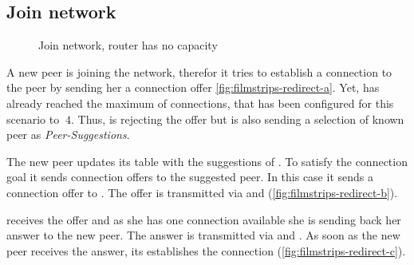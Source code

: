 \subsection{Join network }

\begin{figure}[htb!]
  \centering
	\caption{Join network, router has no capacity}
\label{fig:filmstrips-redirect}
\end{figure}

A new peer is joining the network, therefor it tries to establish a connection to the \router peer \alice by sending her a connection offer \vref{fig:filmstrips-redirect-a}. 
Yet, \alice has already reached the maximum of connections, that has been configured for this scenario to $\ 4 $. Thus, \alice is rejecting the offer but is also sending a selection of known peer as \textit{Peer-Suggestions}.

The new peer updates its table with the suggestions of \alice. To satisfy the connection goal it sends connection offers to the suggested peer. In this case it sends a connection offer to \claire. The offer is transmitted via \signal and \alice (\vref{fig:filmstrips-redirect-b}). 

\claire receives the offer and as she has one connection available she is sending back her answer to the new peer. The answer is transmitted via \alice and \signal. As soon as the new peer receives the answer, its establishes the connection (\vref{fig:filmstrips-redirect-c}).
